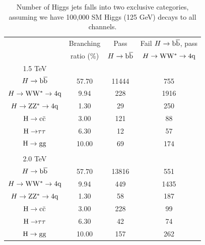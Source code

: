 \begin{table}[htbp]
\begin{center}
\caption{Number of Higgs jets falls into two exclusive categories, assuming we have 100,000 SM Higgs (125 GeV) decays to all channels.}
\begin{tabular}{cccc}
\hline
& Branching  & Pass       & Fail $H\to\mathrm{b\overline{b}}$, pass \\
& ratio (\%) & $H\to\mathrm{b\overline{b}}$  &   $H\to{\rm W}{\rm W}^*\to4{\rm q}$ \\ 
\hline
1.5 TeV  & & & \\
$H\to\mathrm{b\overline{b}}$ & 57.70 & 11444 &  755 \\ %
$H\to{\rm W}{\rm W}^*\to4{\rm q}$ & 9.94 & 228 & 1916 \\ %
$H\to{\rm Z}{\rm Z}^*\to4{\rm q}$ & 1.30 & 29 & 250 \\ %
${\rm H\to c\bar{c}}$ & 3.00 & 121 & 88 \\ %
${\rm H\to} \tau \tau$ & 6.30 & 12  & 57 \\ %
${\rm H\to gg}$ & 10.00 & 69 & 174 \\ %
\hline
\\
2.0 TeV &  & & \\ %
$H\to\mathrm{b\overline{b}}$ & 57.70 & 13816 & 551 \\ %
$H\to{\rm W}{\rm W}^*\to4{\rm q}$ & 9.94 & 449 & 1435 \\ %
$H\to{\rm Z}{\rm Z}^*\to4{\rm q}$ & 1.30 & 58 & 187 \\ %
${\rm H\to c\bar{c}}$ & 3.00 & 228 & 99 \\ %
${\rm H\to} \tau \tau$ & 6.30 & 42 & 74 \\ %
${\rm H\to gg}$ & 10.00 & 157  & 262 \\ \hline
\end{tabular}
\label{table:HbbHww}
\end{center}
\end{table}






